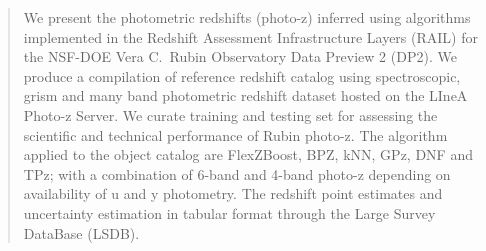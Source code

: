 
\begin{abstract}
We present the photometric redshifts (photo-z) inferred using algorithms implemented in the Redshift Assessment Infrastructure Layers (RAIL) for the NSF-DOE Vera C.\ Rubin Observatory Data Preview 2 (DP2).
We produce a compilation of reference redshift catalog using spectroscopic, grism and many band photometric redshift dataset hosted on the LIneA Photo-z Server.
We curate training and testing set for assessing the scientific and technical performance of Rubin photo-z.
The algorithm applied to the object catalog are FlexZBoost, BPZ, kNN, GPz, DNF and TPz; with a combination of 6-band and 4-band photo-z depending on availability of u and y photometry.
The redshift point estimates and uncertainty estimation in tabular format through the Large Survey DataBase (LSDB).
\end{abstract}
